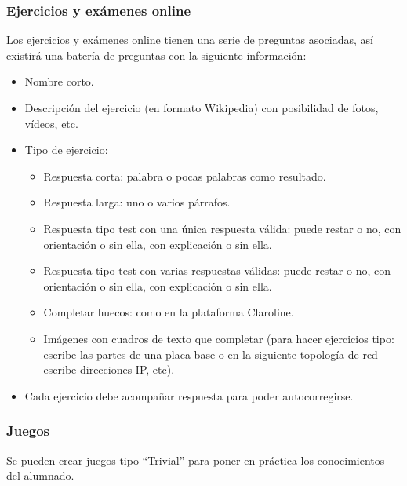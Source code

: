 \documentclass[12pt,twoside,a4paper]{article}
\begin{document}
\subsubsection{Ejercicios y exámenes online}
Los ejercicios y exámenes online tienen una serie de preguntas asociadas, así existirá una batería de preguntas con la siguiente información:
\begin{itemize}
\item Nombre corto.
\item Descripción del ejercicio (en formato Wikipedia) con posibilidad de fotos, vídeos, etc.
\item Tipo de ejercicio:
  \begin{itemize}
  \item Respuesta corta: palabra o pocas palabras como resultado.
  \item Respuesta larga: uno o varios párrafos.
  \item Respuesta tipo test con una única respuesta válida: puede restar o no, con orientación o sin ella, con explicación o sin ella.
  \item Respuesta tipo test con varias respuestas válidas: puede restar o no, con orientación o sin ella, con explicación o sin ella.
  \item Completar huecos: como en la plataforma Claroline.
  \item Imágenes con cuadros de texto que completar (para hacer ejercicios tipo: escribe las partes de una placa base o en la siguiente topología de red escribe direcciones IP, etc).
  \end{itemize}
\item Cada ejercicio debe acompañar respuesta para poder autocorregirse.
\end{itemize}

\subsubsection{Juegos}
Se pueden crear juegos tipo ``Trivial'' para poner en práctica los conocimientos del alumnado.
\end{document}
